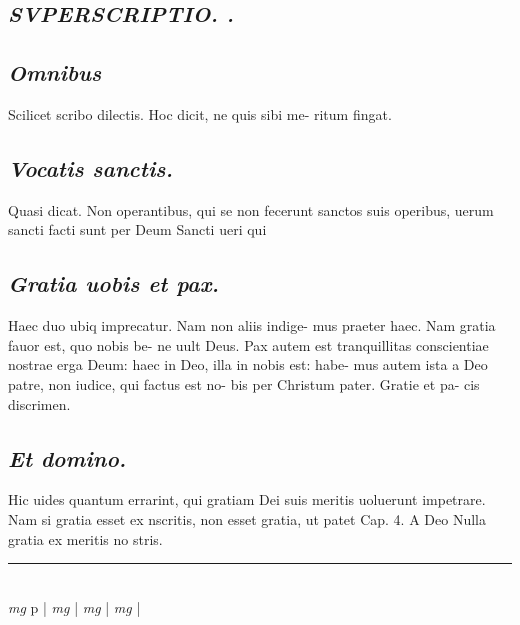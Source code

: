 \documentclass{article}
\begin{document}
\begin{pages}
\subsection*{\textit{SVPERSCRIPTIO. . }}
{}
\subsection*{\textit{Omnibus }}\pstart Scilicet scribo dilectis. Hoc dicit, ne quis sibi me- ritum fingat.   \pend
{}
{}
\subsection*{\textit{Vocatis sanctis. }}\pstart Quasi dicat. Non operantibus, qui se non fecerunt sanctos suis operibus, uerum sancti facti sunt per Deum Sancti ueri qui  \pend
{}
{}
\subsection*{\textit{Gratia uobis et pax. }}\pstart Haec duo ubiq imprecatur. Nam non aliis indige- mus praeter haec. Nam gratia fauor est, quo nobis be- ne uult Deus. Pax autem est tranquillitas conscientiae nostrae erga Deum: haec in Deo, illa in nobis est: habe- mus autem ista a Deo patre, non iudice, qui factus est no- bis per Christum pater.  Gratie et pa- cis discrimen.   \pend
{}
{}
\subsection*{\textit{Et domino. }}\pstart Hic uides quantum errarint, qui gratiam Dei suis meritis uoluerunt impetrare. Nam si gratia esset ex nscritis, non esset gratia, ut patet Cap. 4. A Deo Nulla gratia ex meritis no stris.  \pend
\vspace{0.5cm}\noindent
\vspace{0.2cm}\rule{1cm}{0.2pt}\\ 
\hspace{0.2cm}\textit{mg}
\footnotesize p 
\normalsize| 
\hspace{0.2cm}\textit{mg}
\footnotesize 
\normalsize| 
\hspace{0.2cm}\textit{mg}
\footnotesize 
\normalsize| 
\hspace{0.2cm}\textit{mg}
\footnotesize 
\normalsize| 

\end{pages}
\end{document}
